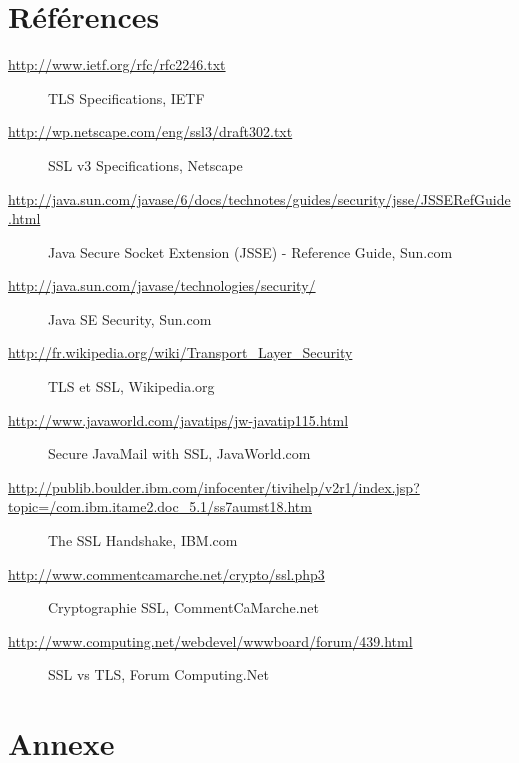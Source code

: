 \documentclass[10pt,a4paper,titlepage]{article}
\begin{document}
\section{Références}

{\scriptsize
\begin{description}
	\item[\url{http://www.ietf.org/rfc/rfc2246.txt}] TLS Specifications, IETF
	\item[\url{http://wp.netscape.com/eng/ssl3/draft302.txt}] SSL v3 Specifications, Netscape
	\item[\url{http://java.sun.com/javase/6/docs/technotes/guides/security/jsse/JSSERefGuide.html}]	Java Secure Socket Extension (JSSE) - Reference Guide, Sun.com
	\item[\url{http://java.sun.com/javase/technologies/security/}] Java SE Security, Sun.com
	\item[\url{http://fr.wikipedia.org/wiki/Transport_Layer_Security}] {TLS et SSL, Wikipedia.org}
	\item[\url{http://www.javaworld.com/javatips/jw-javatip115.html}] Secure JavaMail with SSL, JavaWorld.com
	\item[\url{http://publib.boulder.ibm.com/infocenter/tivihelp/v2r1/index.jsp?topic=/com.ibm.itame2.doc_5.1/ss7aumst18.htm}] The SSL Handshake, IBM.com
	\item[\url{http://www.commentcamarche.net/crypto/ssl.php3}] Cryptographie SSL, CommentCaMarche.net
	\item[\url{http://www.computing.net/webdevel/wwwboard/forum/439.html}] SSL vs TLS, Forum Computing.Net
\end{description}
}

\section{Annexe}
\end{document}
